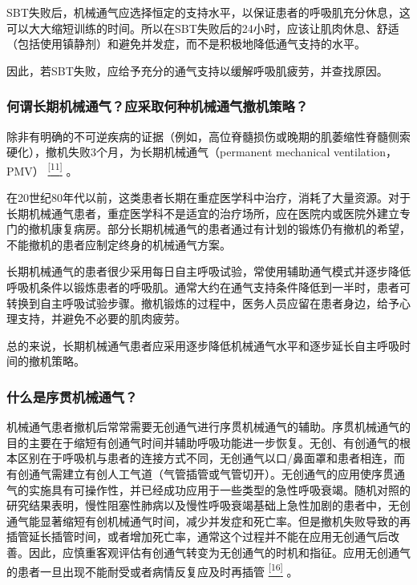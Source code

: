 SBT失败后，机械通气应选择恒定的支持水平，以保证患者的呼吸肌充分休息，这可以大大缩短训练的时间。所以在SBT失败后的24小时，应该让肌肉休息、舒适（包括使用镇静剂）和避免并发症，而不是积极地降低通气支持的水平。

因此，若SBT失败，应给予充分的通气支持以缓解呼吸肌疲劳，并查找原因。

\subsubsection{何谓长期机械通气？应采取何种机械通气撤机策略？}

除非有明确的不可逆疾病的证据（例如，高位脊髓损伤或晚期的肌萎缩性脊髓侧索硬化），撤机失败3个月，为长期机械通气（permanent
mechanical ventilation，PMV）
\protect\hyperlink{text00016.htmlux5cux23ch11-15}{\textsuperscript{{[}11{]}}}
。

在20世纪80年代以前，这类患者长期在重症医学科中治疗，消耗了大量资源。对于长期机械通气患者，重症医学科不是适宜的治疗场所，应在医院内或医院外建立专门的撤机康复病房。部分长期机械通气的患者通过有计划的锻炼仍有撤机的希望，不能撤机的患者应制定终身的机械通气方案。

长期机械通气的患者很少采用每日自主呼吸试验，常使用辅助通气模式并逐步降低呼吸机条件以锻炼患者的呼吸肌。通常大约在通气支持条件降低到一半时，患者可转换到自主呼吸试验步骤。撤机锻炼的过程中，医务人员应留在患者身边，给予心理支持，并避免不必要的肌肉疲劳。

总的来说，长期机械通气患者应采用逐步降低机械通气水平和逐步延长自主呼吸时间的撤机策略。

\subsubsection{什么是序贯机械通气？}

机械通气患者撤机后常常需要无创通气进行序贯机械通气的辅助。序贯机械通气的目的主要在于缩短有创通气时间并辅助呼吸功能进一步恢复。无创、有创通气的根本区别在于呼吸机与患者的连接方式不同，无创通气以口/鼻面罩和患者相连，而有创通气需建立有创人工气道（气管插管或气管切开）。无创通气的应用使序贯通气的实施具有可操作性，并已经成功应用于一些类型的急性呼吸衰竭。随机对照的研究结果表明，慢性阻塞性肺病以及慢性呼吸衰竭基础上急性加剧的患者中，无创通气能显著缩短有创机械通气时间，减少并发症和死亡率。但是撤机失败导致的再插管延长插管时间，或者增加死亡率，通常这个过程并不能在应用无创通气后改善。因此，应慎重客观评估有创通气转变为无创通气的时机和指征。应用无创通气的患者一旦出现不能耐受或者病情反复应及时再插管
\protect\hyperlink{text00016.htmlux5cux23ch16-15}{\textsuperscript{{[}16{]}}}
。

